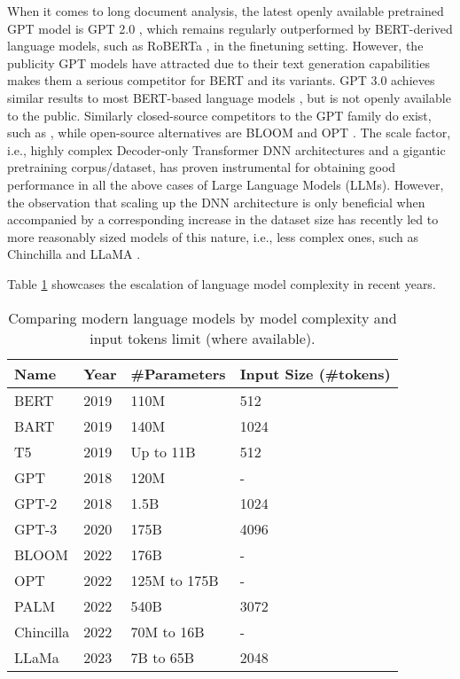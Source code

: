 \documentclass[preprint,review,10pt]{elsarticle}
\begin{document}
	When it comes to long document analysis, the latest openly available pretrained GPT model is GPT 2.0 \cite{GPT2}, which remains regularly outperformed by BERT-derived language models, such as RoBERTa \cite{tanyangxing}, in the finetuning setting. However, the publicity GPT models have attracted due to their text generation capabilities makes them a serious competitor for BERT and its variants. GPT 3.0 achieves similar results to most BERT-based language models \cite{tanyangxing}, but is not openly available to the public. Similarly closed-source competitors to the GPT family do exist, such as \cite{chowdhery2022palm}, while open-source alternatives are BLOOM \cite{scao2022bloom} and OPT \cite{zhang2022opt}. The scale factor, i.e., highly complex Decoder-only Transformer DNN architectures and a gigantic pretraining corpus/dataset, has proven instrumental for obtaining good performance in all the above cases of Large Language Models (LLMs). However, the observation that scaling up the DNN architecture is only beneficial when accompanied by a corresponding increase in the dataset size has recently led to more reasonably sized models of this nature, i.e., less complex ones, such as Chinchilla \cite{hoffmann2022empirical} and LLaMA \cite{Touvron2023llama}. 
	
	Table \ref{tab::ModelComplexity} showcases the escalation of language model complexity in recent years.
	
	\begin{table}
		\centering
		\begin{tabular}{ |p{3cm}|p{3cm}|p{3cm}|p{3cm}| }
			\hline
			\cellcolor{blue!25}\textbf{Name} & \cellcolor{blue!25}\textbf{Year} & \cellcolor{blue!25}\textbf{\#Parameters} & \cellcolor{blue!25}\textbf{Input Size (\#tokens)} \\
			\hline
			BERT & 2019 & 110M & 512 \\
			\hline
			BART & 2019 & 140M & 1024 \\
			\hline
			T5 & 2019 & Up to 11B & 512 \\
			\hline
			GPT & 2018 & 120M &  - \\
			\hline
			GPT-2 & 2018 & 1.5B & 1024 \\
			\hline
			GPT-3 & 2020 & 175B & 4096\\
			\hline
			BLOOM & 2022 & 176B & - \\
			\hline
			OPT & 2022 & 125M to 175B & - \\
			\hline
			PALM & 2022 & 540B & 3072 \\
			\hline
			Chincilla & 2022 & 70M to 16B & - \\
			\hline
			LLaMa & 2023 & 7B to 65B & 2048 \\
			\hline
		\end{tabular}
		\caption{Comparing modern language models by model complexity and input tokens limit (where available).}
		\label{tab::ModelComplexity}
	\end{table}
	
\end{document}
